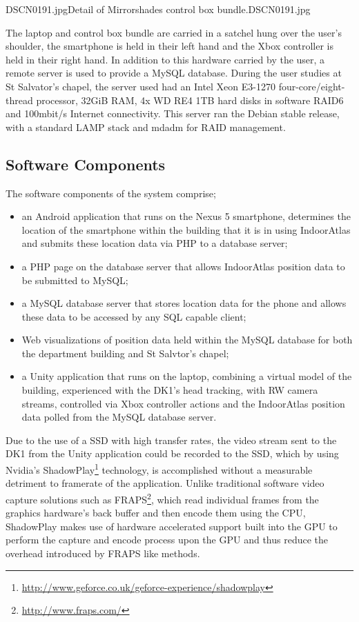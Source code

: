        {DSCN0191.jpg}{Detail of Mirrorshades control box bundle.}{DSCN0191.jpg}

The laptop and control box bundle are carried in a satchel hung over the user's shoulder, the smartphone is held in their left hand and the Xbox controller is held in their right hand. In addition to this hardware carried by the user, a remote server is used to provide a MySQL database. During the user studies at St Salvator's chapel, the server used had an Intel Xeon E3-1270 four-core/eight-thread processor, 32GiB RAM, 4x WD RE4 1TB hard disks in software RAID6 and 100mbit/s Internet connectivity. This server ran the Debian stable release, with a standard LAMP stack and mdadm for RAID management.

\subsection{Software Components}
The software components of the system comprise;
\begin{itemize}
	\item an Android application that runs on the Nexus 5 smartphone, determines the location of the smartphone within the building that it is in using IndoorAtlas and submits these location data via PHP to a database server;
	\item a PHP page on the database server that allows IndoorAtlas position data to be submitted to MySQL;
	\item a MySQL database server that stores location data for the phone and allows these data to be accessed by any SQL capable client;
	\item Web visualizations of position data held within the MySQL database for both the department building and St Salvtor's chapel;
	\item a Unity application that runs on the laptop, combining a virtual model of the building, experienced with the DK1's head tracking, with RW camera streams, controlled via Xbox controller actions and the IndoorAtlas position data polled from the MySQL database server.
\end{itemize}

Due to the use of a SSD with high transfer rates, the video stream sent to the DK1 from the Unity application could be recorded to the SSD, which by using Nvidia's ShadowPlay\footnote{\url{http://www.geforce.co.uk/geforce-experience/shadowplay}} technology, is accomplished without a measurable detriment to framerate of the application. Unlike traditional software video capture solutions such as FRAPS\footnote{\url{http://www.fraps.com/}}, which read individual frames from the graphics hardware's back buffer and then encode them using the CPU, ShadowPlay makes use of hardware accelerated support built into the GPU to perform the capture and encode process upon the GPU and thus reduce the overhead introduced by FRAPS like methods.

